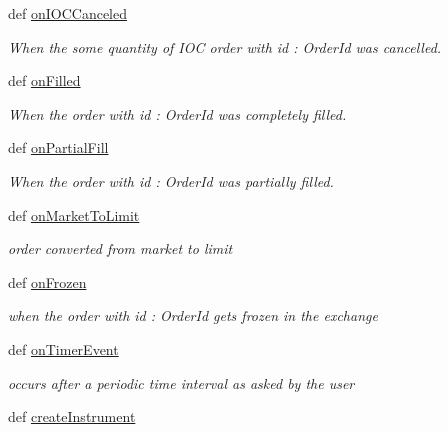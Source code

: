 \begin{DoxyCompactItemize}
def \hyperlink{classmuTradePyBase_1_1CustomStrategy_a409e9147a6d8d52dc2d3ad04544e31f3}{onIOCCanceled}
\begin{DoxyCompactList}\small\item\em When the some quantity of IOC order with id : OrderId was cancelled. \item\end{DoxyCompactList}\item 
def \hyperlink{classmuTradePyBase_1_1CustomStrategy_afade8f1587aab216a8aa6a7f0be1300f}{onFilled}
\begin{DoxyCompactList}\small\item\em When the order with id : OrderId was completely filled. \item\end{DoxyCompactList}\item 
def \hyperlink{classmuTradePyBase_1_1CustomStrategy_a5d2894514fc731a0298c2139435dbd20}{onPartialFill}
\begin{DoxyCompactList}\small\item\em When the order with id : OrderId was partially filled. \item\end{DoxyCompactList}\item 
def \hyperlink{classmuTradePyBase_1_1CustomStrategy_ab15e441859c93390410973beb565872a}{onMarketToLimit}
\begin{DoxyCompactList}\small\item\em order converted from market to limit \item\end{DoxyCompactList}\item 
def \hyperlink{classmuTradePyBase_1_1CustomStrategy_a40cb69958575c0a0a7e435d3ac0fe9f9}{onFrozen}
\begin{DoxyCompactList}\small\item\em when the order with id : OrderId gets frozen in the exchange \item\end{DoxyCompactList}\item 
def \hyperlink{classmuTradePyBase_1_1CustomStrategy_add6aa61bb18c2c3a4de459865fe83f62}{onTimerEvent}
\begin{DoxyCompactList}\small\item\em occurs after a periodic time interval as asked by the user \item\end{DoxyCompactList}\item 
def \hyperlink{classmuTradePyBase_1_1CustomStrategy_a71716af3dce670bfe2ec9a1d8a73afc3}{createInstrument}

\end{DoxyCompactItemize}
